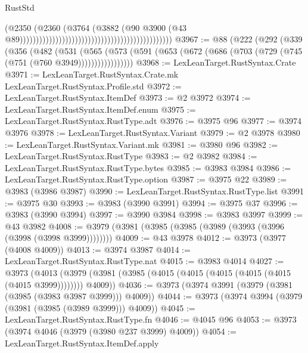 \begin{lexlean}{RustStd}
\begin{coremodule}
                                                                                      (@2350
                                                                                        (@2360
                                                                                          (@3764
                                                                                            (@3882
                                                                                              (@90
                                                                                                @3900
                                                                                                (@43
                                                                                                  @89)))))))))))))))))))))))))))))))))))))))))))))))
@3967 := @88
    (@222
      (@292
        (@339
          (@356
            (@482
              (@531
                (@565
                  (@573 (@591 (@653 (@672 (@686 (@703 (@729 (@745 (@751 (@760 @3949)))))))))))))))))
@3968 := LexLeanTarget.RustSyntax.Crate
@3971 := LexLeanTarget.RustSyntax.Crate.mk LexLeanTarget.RustSyntax.Profile.std
@3972 := LexLeanTarget.RustSyntax.ItemDef
@3973 := @2 @3972
@3974 := LexLeanTarget.RustSyntax.ItemDef.enum
@3975 := LexLeanTarget.RustSyntax.RustType.adt
@3976 := @3975 @96
@3977 := @3974 @3976
@3978 := LexLeanTarget.RustSyntax.Variant
@3979 := @2 @3978
@3980 := LexLeanTarget.RustSyntax.Variant.mk
@3981 := @3980 @96
@3982 := LexLeanTarget.RustSyntax.RustType
@3983 := @2 @3982
@3984 := LexLeanTarget.RustSyntax.RustType.bytes
@3985 := @3983 @3984
@3986 := LexLeanTarget.RustSyntax.RustType.option
@3987 := @3975 @22
@3989 := @3983 (@3986 @3987)
@3990 := LexLeanTarget.RustSyntax.RustType.list
@3991 := @3975 @30
@3993 := @3983 (@3990 @3991)
@3994 := @3975 @37
@3996 := @3983 (@3990 @3994)
@3997 := @3990 @3984
@3998 := @3983 @3997
@3999 := @43 @3982
@4008 := @3979 (@3981 (@3985 (@3985 (@3989 (@3993 (@3996 (@3998 (@3998 @3999))))))))
@4009 := @43 @3978
@4012 := @3973 (@3977 (@4008 @4009))
@4013 := @3974 @3987
@4014 := LexLeanTarget.RustSyntax.RustType.nat
@4015 := @3983 @4014
@4027 := @3973
    (@4013 (@3979 (@3981 (@3985 (@4015 (@4015 (@4015 (@4015 (@4015 (@4015 @3999)))))))) @4009))
@4036 := @3973 (@3974 @3991 (@3979 (@3981 (@3985 (@3983 @3987 @3999))) @4009))
@4044 := @3973 (@3974 @3994 (@3979 (@3981 (@3985 (@3989 @3999))) @4009))
@4045 := LexLeanTarget.RustSyntax.RustType.fn
@4046 := @4045 @96
@4053 := @3973 (@3974 @4046 (@3979 (@3980 @237 @3999) @4009))
@4054 := LexLeanTarget.RustSyntax.ItemDef.apply

\end{coremodule}
\end{lexlean}

